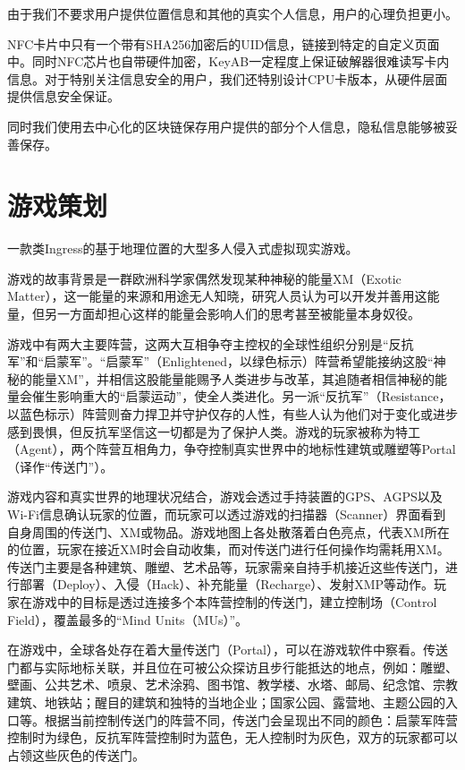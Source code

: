 \documentclass[UTF8]{ctexart}
\begin{document}
由于我们不要求用户提供位置信息和其他的真实个人信息，用户的心理负担更小。

NFC卡片中只有一个带有SHA256加密后的UID信息，链接到特定的自定义页面中。同时NFC芯片也自带硬件加密，KeyAB一定程度上保证破解器很难读写卡内信息。对于特别关注信息安全的用户，我们还特别设计CPU卡版本，从硬件层面提供信息安全保证。

同时我们使用去中心化的区块链保存用户提供的部分个人信息，隐私信息能够被妥善保存。

\section{游戏策划}

一款类Ingress的基于地理位置的大型多人侵入式虚拟现实游戏。

\begin{tcolorbox}[breakable]
    游戏的故事背景是一群欧洲科学家偶然发现某种神秘的能量XM（Exotic Matter），这一能量的来源和用途无人知晓，研究人员认为可以开发并善用这能量，但另一方面却担心这样的能量会影响人们的思考甚至被能量本身奴役。

    游戏中有两大主要阵营，这两大互相争夺主控权的全球性组织分别是“反抗军”和“启蒙军”。“启蒙军”（Enlightened，以绿色标示）阵营希望能接纳这股“神秘的能量XM”，并相信这股能量能赐予人类进步与改革，其追随者相信神秘的能量会催生影响重大的“启蒙运动”，使全人类进化。另一派“反抗军”（Resistance，以蓝色标示）阵营则奋力捍卫并守护仅存的人性，有些人认为他们对于变化或进步感到畏惧，但反抗军坚信这一切都是为了保护人类。游戏的玩家被称为特工（Agent），两个阵营互相角力，争夺控制真实世界中的地标性建筑或雕塑等Portal（译作“传送门”）。

    游戏内容和真实世界的地理状况结合，游戏会透过手持装置的GPS、AGPS以及Wi-Fi信息确认玩家的位置，而玩家可以透过游戏的扫描器（Scanner）界面看到自身周围的传送门、XM或物品。游戏地图上各处散落着白色亮点，代表XM所在的位置，玩家在接近XM时会自动收集，而对传送门进行任何操作均需耗用XM。传送门主要是各种建筑、雕塑、艺术品等，玩家需亲自持手机接近这些传送门，进行部署（Deploy）、入侵（Hack）、补充能量（Recharge）、发射XMP等动作。玩家在游戏中的目标是透过连接多个本阵营控制的传送门，建立控制场（Control Field），覆盖最多的“Mind Units（MUs）”。

    在游戏中，全球各处存在着大量传送门（Portal），可以在游戏软件中察看。传送门都与实际地标关联，并且位在可被公众探访且步行能抵达的地点，例如：雕塑、壁画、公共艺术、喷泉、艺术涂鸦、图书馆、教学楼、水塔、邮局、纪念馆、宗教建筑、地铁站；醒目的建筑和独特的当地企业；国家公园、露营地、主题公园的入口等。根据当前控制传送门的阵营不同，传送门会呈现出不同的颜色：启蒙军阵营控制时为绿色，反抗军阵营控制时为蓝色，无人控制时为灰色，双方的玩家都可以占领这些灰色的传送门。


\end{tcolorbox}
\end{document}
